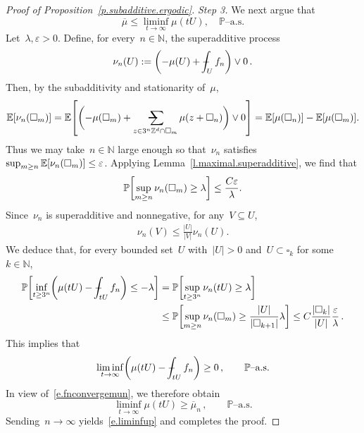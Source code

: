 \documentclass[11pt,twoside]{article} %
\makeatletter
\let\oldsquare\square %
\renewcommand{\square}{\oldsquare}
\numberwithin{equation}{section}
\theoremstyle{definition}
\let\originalleft\left
\let\originalright\right
\renewcommand{\left}{\mathopen{}\mathclose\bgroup\originalleft}
\renewcommand{\right}{\aftergroup\egroup\originalright}
\newcommand*{\N}{\ensuremath{\mathbb{N}}}
\newcommand*{\Z}{\ensuremath{\mathbb{Z}}}
\newcommand{\eps}{\varepsilon}
\newcommand{\ep}{\eps}
\newcommand{\cu}{\square}
\renewcommand{\P}{\mathbb{P}}
\newcommand{\E}{\mathbb{E}}
\newcommand{\avsum}{\mathop{\mathpalette\avsuminner\relax}\displaylimits}
\newcommand\avsuminner[2]{%
  {\sbox0{$\m@th#1\sum$}%
   \vphantom{\usebox0}%
   \ooalign{%
     \hidewidth
     \smash{\,\rule[.23em]{8.8pt}{1.1pt} \relax}%
     \hidewidth\cr
   ~$\m@th#1\sum$\cr
   }%
  }%
}
\def\Xint#1{\mathchoice
{\XXint\displaystyle\textstyle{#1}}%
{\XXint\textstyle\scriptstyle{#1}}%
{\XXint\scriptstyle\scriptscriptstyle{#1}}%
{\XXint\scriptscriptstyle\scriptscriptstyle{#1}}%
\!\int}
\def\XXint#1#2#3{{\setbox0=\hbox{$#1{#2#3}{\int}$}
\vcenter{\hbox{$#2#3$}}\kern-.5\wd0}}
\def\fint{\Xint-}
\makeatother
\begin{document}
\begin{proof}[{Proof of Proposition~\ref{p.subadditive.ergodic}}]
\emph{Step 3.}
We next argue that 
\begin{equation}
\label{e.liminfup}
\overline{\mu}
\leq 
\liminf_{t\to \infty} \mu(t U) , 
\quad \mbox{$\P$--a.s.}
\end{equation}
Let~$\lambda,\ep>0$. Define, for every~$n \in \N$, the superadditive process
\begin{equation*}
\nu_n(U):= \biggl( - \mu(U) + \fint_U f_n \biggr) \vee 0 \,.
\end{equation*}
Then, by the subadditivity and stationarity of~$\mu$, 
\begin{align*}  
\E \left[ \nu_n(\cu_m) \right] = \E \left[ \biggl(  - \mu(\cu_m) + \avsum_{z \in 3^n \Z^d \cap \cu_m} \mu(z+\cu_n)
\biggr) \vee 0 \right] = \E \left[\mu(\cu_n)\right] -  \E \left[\mu(\cu_m)\right]  .
\end{align*}
Thus we may take~$n\in\N$ large enough so that~$\nu_n$ satisfies~$\sup_{m\geq n}\E \left[ \nu_n(\cu_m) \right] \leq \ep$. 
Applying Lemma~\ref{l.maximal.superadditive}, we find that 
\begin{equation*}
\P \left[ 
\sup_{m\geq n} \nu_n (\cu_m) \geq \lambda
\right] 
\leq 
\frac{C \ep}{\lambda}. 
\end{equation*}
Since~$\nu_n$ is superadditive and nonnegative, for any~$V \subseteq U$, 
\begin{align*}
\nu_n(V) \leq \frac{|U|}{|V|} \nu_n(U). 
\end{align*}
We deduce that, for every bounded set~$U$ with~$|U|>0$ and~$U \subset \cu_k$ for some~$k \in \N$, 
\begin{align*}
\P \left[ 
\inf_{t\geq 3^n} \left( \mu(tU) - \fint_{tU} f_n \right) \leq - \lambda
\right] 
& =
\P \left[ 
\sup_{t\geq 3^n} \nu_n(tU) \geq \lambda
\right] 
\\ & \leq 
\P \left[ 
\sup_{m\geq n} \nu_n(\cu_m) \geq \frac{|U|}{|\cu_{k+1}|} \lambda
\right] 
\leq
C \frac{|\cu_k|}{|U|} \frac{\ep}{\lambda}\,.
\end{align*}
This implies that
\begin{equation*}
\liminf_{t\to \infty} 
\left( \mu(tU) - \fint_{tU} f_n \right)
\geq 0\,,\qquad \mbox{$\P$--a.s.}
\end{equation*}
In view of~\eqref{e.fnconvergemun}, we therefore obtain
\begin{equation*}
\liminf_{t\to \infty} \mu(tU) 
\geq \overline{\mu}_n\,,\qquad \mbox{$\P$--a.s.}
\end{equation*}
Sending~$n\to \infty$ yields~\eqref{e.liminfup} and completes the proof. 
\end{proof}
\end{document}
